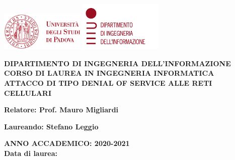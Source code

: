 \begin{titlepage}
  \begin{center}
    \includegraphics[width=0.3\textwidth]{images/unipd.png}
    \hfill
    \includegraphics[width=0.3\textwidth]{images/dei.png}
  \end{center}
  \begin{center}
    \vspace{3cm}
    \large
    \MakeUppercase{
      \textbf{
        Dipartimento di ingegneria dell'informazione\\
        \vspace{0.5cm}
        Corso di laurea in Ingegneria Informatica\\
      }
    }
    \vspace{5cm}
    \MakeUppercase{
      \textbf{
        Attacco di tipo Denial of Service alle reti cellulari\\
      }
    }
    \vspace{5cm}
    \begin{flushleft}
      \textbf{
        Relatore: Prof. Mauro Migliardi\\
      }
    \end{flushleft}
    \vspace{1cm}
    \begin{flushright}
      \textbf{
        Laureando: Stefano Leggio\\
      }
    \end{flushright}
    \vspace{2cm}
    \MakeUppercase{
      \textbf{
        Anno accademico: 2020-2021\\
      }
    }
    \vspace{0.5cm}
    \textbf{
      Data di laurea:
    }
  \end{center}
\end{titlepage}